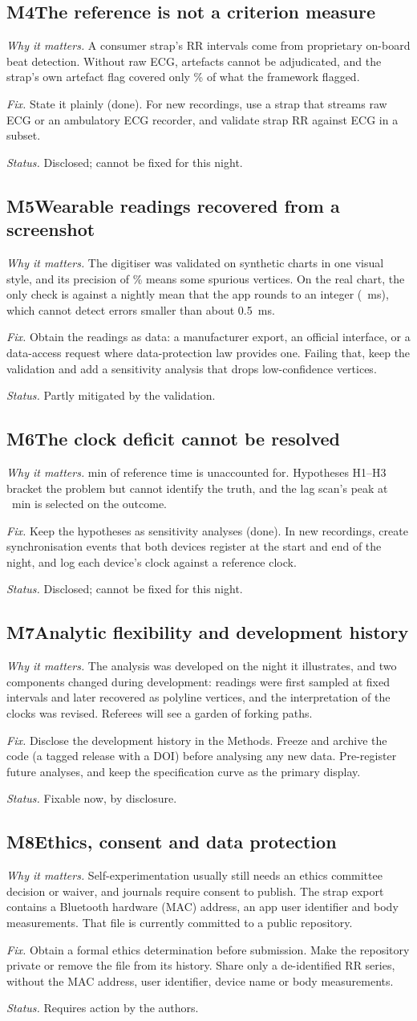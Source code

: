 \documentclass[11pt,a4paper]{article}
\newcommand{\issue}[5]{%
  \needspace{6\baselineskip}%
  \subsection*{#1\quad #2}
  \textit{Why it matters.} #3\par
  \textit{Fix.} #4\par
  \textit{Status.} #5\par}
\begin{document}
\issue{M4}{The reference is not a criterion measure}
{A consumer strap's RR intervals come from proprietary on-board beat detection. Without raw ECG, artefacts cannot be adjudicated, and the strap's own artefact flag covered only \deviceCoveragePct\% of what the framework flagged.}
{State it plainly (done). For new recordings, use a strap that streams raw ECG or an ambulatory ECG recorder, and validate strap RR against ECG in a subset.}
{Disclosed; cannot be fixed for this night.}

\issue{M5}{Wearable readings recovered from a screenshot}
{The digitiser was validated on synthetic charts in one visual style, and its precision of \digPrecision\% means some spurious vertices. On the real chart, the only check is against a nightly mean that the app rounds to an integer (\watchReported{}~ms), which cannot detect errors smaller than about 0.5~ms.}
{Obtain the readings as data: a manufacturer export, an official interface, or a data-access request where data-protection law provides one. Failing that, keep the validation and add a sensitivity analysis that drops low-confidence vertices.}
{Partly mitigated by the validation.}

\issue{M6}{The clock deficit cannot be resolved}
{\clockDeficitMin{} min of reference time is unaccounted for. Hypotheses H1--H3 bracket the problem but cannot identify the truth, and the lag scan's peak at \lagBest{}~min is selected on the outcome.}
{Keep the hypotheses as sensitivity analyses (done). In new recordings, create synchronisation events that both devices register at the start and end of the night, and log each device's clock against a reference clock.}
{Disclosed; cannot be fixed for this night.}

\issue{M7}{Analytic flexibility and development history}
{The analysis was developed on the night it illustrates, and two components changed during development: readings were first sampled at fixed intervals and later recovered as polyline vertices, and the interpretation of the clocks was revised. Referees will see a garden of forking paths.}
{Disclose the development history in the Methods. Freeze and archive the code (a tagged release with a DOI) before analysing any new data. Pre-register future analyses, and keep the specification curve as the primary display.\autocite{steegen2016,simonsohn2020}}
{Fixable now, by disclosure.}

\issue{M8}{Ethics, consent and data protection}
{Self-experimentation usually still needs an ethics committee decision or waiver, and journals require consent to publish. The strap export contains a Bluetooth hardware (MAC) address, an app user identifier and body measurements. \textcolor{alert}{That file is currently committed to a public repository.}}
{Obtain a formal ethics determination before submission. Make the repository private or remove the file from its history. Share only a de-identified RR series, without the MAC address, user identifier, device name or body measurements.}
{Requires action by the authors.}
\end{document}
